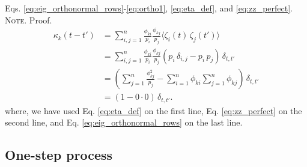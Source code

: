 \documentclass[reprint, floatfix]{revtex4-1}
\newcommand{\note}[1]{{\color{DarkGreen}\footnotesize \textsc{Note.} #1}}
\begin{document}
Eqs. \eqref{eq:eig_orthonormal_rows}-\eqref{eq:ortho1},
\eqref{eq:eta_def},
and
\eqref{eq:zz_perfect}.
%
\note{Proof.%
  $$
  \begin{aligned}
  \kappa_k(t - t')
  &=
  \sum_{i,j = 1}^n
  \frac{ \phi_{ki} } { p_i }
  \frac{ \phi_{kj} } { p_j }
  \langle \zeta_i(t) \, \zeta_j(t') \rangle
  \\
  &=
  \sum_{i,j = 1}^n
  \frac{ \phi_{ki} } { p_i }
  \frac{ \phi_{kj} } { p_j }
  \left(
    p_i \, \delta_{i, j} - p_i \, p_j
  \right)
  \, \delta_{t, t'}
  \\
  &=
  \left(
    \sum_{j = 1}^n
    \frac{ \phi_{kj}^2 } { p_j }
    -
    \sum_{i = 1}^n \phi_{ki}
    \sum_{j = 1}^n \phi_{kj}
  \right)
  \, \delta_{t, t'}
  \\
  &=
  (1 - 0 \cdot 0) \, \delta_{t, t'}.
  \end{aligned}
  $$
  where,
  we have used
  Eq. \eqref{eq:eta_def}
  on the first line,
  Eq. \eqref{eq:zz_perfect}
  on the second line,
  and
  Eq. \eqref{eq:eig_orthonormal_rows}
  on the last line.
}


\subsection{\label{sec:Gamma_onestep}
One-step process}
\end{document}
